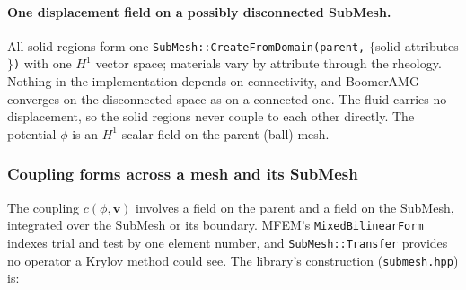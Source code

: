 \documentclass[11pt]{article}
\numberwithin{equation}{section}
\theoremstyle{remark}
\newcommand{\vv}{\mathbf{v}}
\newcommand{\code}[1]{\texttt{#1}}
\begin{document}
\paragraph{One displacement field on a possibly disconnected SubMesh.} All
solid regions form one \code{SubMesh::CreateFromDomain(parent,} $\{$solid
attributes$\}$\code{)} with one $H^1$ vector space; materials vary by attribute
through the rheology. Nothing in the implementation depends on
connectivity, and BoomerAMG converges on the disconnected space as on a
connected one. The fluid carries no displacement, so the solid regions
never couple to each other directly. The potential $\phi$ is an $H^1$
scalar field on the parent (ball) mesh.

\subsubsection{Coupling forms across a mesh and its SubMesh}
\label{sec:submesh}

The coupling $c(\phi,\vv)$ involves a field on the parent and a field on
the SubMesh, integrated over the SubMesh or its boundary. MFEM's
\code{MixedBilinearForm} indexes trial and test by one element number, and
\code{SubMesh::Transfer} provides no operator a Krylov method could see.
The library's construction (\code{submesh.hpp}) is:
\end{document}
